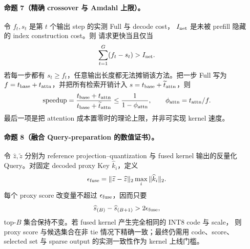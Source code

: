 \paragraph{命题 7（精确 crossover 与 Amdahl 上限）。}
令 $f_t,s_t$ 是第 $t$ 个输出 step 的实测 Full 与 \method decode cost，
$I_{\rm net}$ 是未被 prefill 隐藏的 index construction cost。则 \method
请求更快当且仅当
\begin{equation}
 \sum_{t=1}^{G}(f_t-s_t)>I_{\rm net}.
 \label{eq:exact-break-even}
\end{equation}
若每一步都有 $s_t\ge f_t$，任意输出长度都无法摊销该方法。把一步 Full
写为 $f=t_{\rm base}+t_{\rm attn}$，并把所有检索开销计入
$s=t_{\rm base}+\widetilde t_{\rm attn}$，则
\begin{equation}
 \mathrm{speedup}
 =\frac{t_{\rm base}+t_{\rm attn}}
 {t_{\rm base}+\widetilde t_{\rm attn}}
 \le\frac{1}{1-\phi_{\rm attn}},
 \qquad \phi_{\rm attn}=t_{\rm attn}/f.
 \label{eq:amdahl-ceiling}
\end{equation}
最后一项是把 attention 成本置零时的理论上限，并非可实现 kernel 速度。

\paragraph{命题 8（融合 Query-preparation 的数值证书）。}
令 $\widehat z,\widetilde z$ 分别为 reference projection--quantization 与
fused kernel 输出的反量化 Query。对固定 decoded proxy Key
$\widehat k_i$，定义
\begin{equation}
 \epsilon_{\rm fuse}
 =\|\widetilde z-\widehat z\|_2
 \max_i\|\widehat k_i\|_2.
 \label{eq:fused-query-epsilon}
\end{equation}
每个 proxy score 改变量不超过 $\epsilon_{\rm fuse}$，因而只要
\begin{equation}
 \widehat s_{(B)}-\widehat s_{(B+1)}
 >2\epsilon_{\rm fuse},
 \label{eq:fused-query-margin}
\end{equation}
top-$B$ 集合保持不变。若 fused kernel 产生完全相同的 INT8 code 与 scale，
则 proxy score 与候选集合在非 tie 情况下精确一致；最终仍需用 code、score、
selected set 与 sparse output 的实测一致性作为 kernel 上线门槛。

